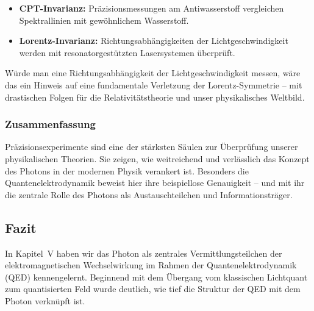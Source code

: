\begin{itemize}
	\item \textbf{CPT-Invarianz:} Präzisionsmessungen am Antiwasserstoff vergleichen Spektrallinien mit gewöhnlichem Wasserstoff.
	\item \textbf{Lorentz-Invarianz:} Richtungsabhängigkeiten der Lichtgeschwindigkeit werden mit resonatorgestützten Lasersystemen überprüft.
\end{itemize}
\vspace{0.5em}
\begin{tcolorbox}[hypobox, title={Was wäre, wenn Licht nicht isotrop wäre?}]
	\label{box:was wäre nicht isotop}
	
	Würde man eine Richtungsabhängigkeit der Lichtgeschwindigkeit messen, wäre das ein Hinweis auf eine fundamentale Verletzung der Lorentz-Symmetrie – mit drastischen Folgen für die Relativitätstheorie und unser physikalisches Weltbild.
\end{tcolorbox}

\subsubsection{Zusammenfassung}

Präzisionsexperimente sind eine der stärksten Säulen zur Überprüfung unserer physikalischen Theorien. Sie zeigen, wie weitreichend und verlässlich das Konzept des Photons in der modernen Physik verankert ist. Besonders die Quantenelektrodynamik beweist hier ihre beispiellose Genauigkeit – und mit ihr die zentrale Rolle des Photons als Austauschteilchen und Informationsträger.

\subsection{Fazit}

In Kapitel~V haben wir das Photon als zentrales Vermittlungsteilchen der elektromagnetischen Wechselwirkung im Rahmen der Quantenelektrodynamik (QED) kennengelernt. Beginnend mit dem Übergang vom klassischen Lichtquant zum quantisierten Feld wurde deutlich, wie tief die Struktur der QED mit dem Photon verknüpft ist. 

